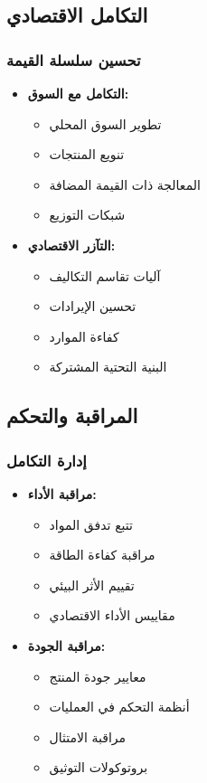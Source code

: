 \subsection{التكامل الاقتصادي}

\subsubsection{تحسين سلسلة القيمة}
\begin{itemize}
    \item \textbf{التكامل مع السوق:}
    \begin{itemize}
        \item تطوير السوق المحلي
        \item تنويع المنتجات
        \item المعالجة ذات القيمة المضافة
        \item شبكات التوزيع
    \end{itemize}
    
    \item \textbf{التآزر الاقتصادي:}
    \begin{itemize}
        \item آليات تقاسم التكاليف
        \item تحسين الإيرادات
        \item كفاءة الموارد
        \item البنية التحتية المشتركة
    \end{itemize}
\end{itemize}

\subsection{المراقبة والتحكم}

\subsubsection{إدارة التكامل}
\begin{itemize}
    \item \textbf{مراقبة الأداء:}
    \begin{itemize}
        \item تتبع تدفق المواد
        \item مراقبة كفاءة الطاقة
        \item تقييم الأثر البيئي
        \item مقاييس الأداء الاقتصادي
    \end{itemize}
    
    \item \textbf{مراقبة الجودة:}
    \begin{itemize}
        \item معايير جودة المنتج
        \item أنظمة التحكم في العمليات
        \item مراقبة الامتثال
        \item بروتوكولات التوثيق
    \end{itemize}
\end{itemize}

